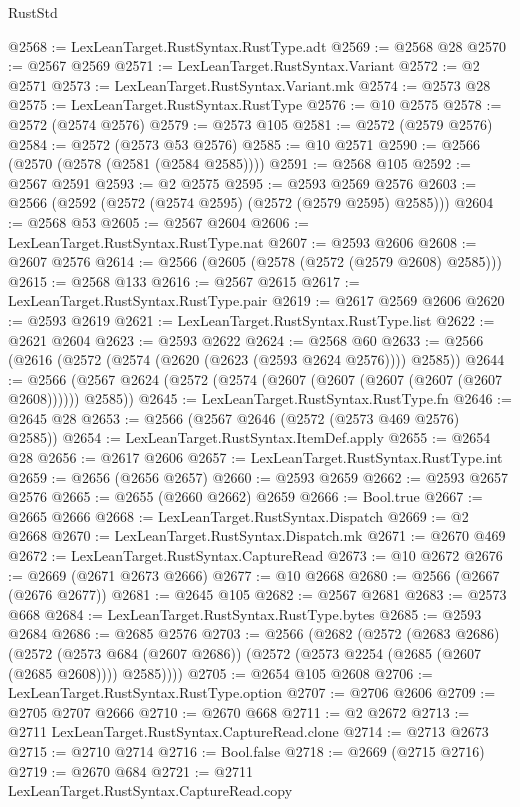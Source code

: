 \begin{lexlean}{RustStd}
\begin{coremodule}
{\begin{coremodule}
{{{{{{{{{{{{{{{{{{{{{{{{{{{{{{{{{{{{{{{{{{{{{{{{{{{{{{{{{{{{{{{{{{{{{{{{{{{{{{@2568 := LexLeanTarget.RustSyntax.RustType.adt
@2569 := @2568 @28
@2570 := @2567 @2569
@2571 := LexLeanTarget.RustSyntax.Variant
@2572 := @2 @2571
@2573 := LexLeanTarget.RustSyntax.Variant.mk
@2574 := @2573 @28
@2575 := LexLeanTarget.RustSyntax.RustType
@2576 := @10 @2575
@2578 := @2572 (@2574 @2576)
@2579 := @2573 @105
@2581 := @2572 (@2579 @2576)
@2584 := @2572 (@2573 @53 @2576)
@2585 := @10 @2571
@2590 := @2566 (@2570 (@2578 (@2581 (@2584 @2585))))
@2591 := @2568 @105
@2592 := @2567 @2591
@2593 := @2 @2575
@2595 := @2593 @2569 @2576
@2603 := @2566 (@2592 (@2572 (@2574 @2595) (@2572 (@2579 @2595) @2585)))
@2604 := @2568 @53
@2605 := @2567 @2604
@2606 := LexLeanTarget.RustSyntax.RustType.nat
@2607 := @2593 @2606
@2608 := @2607 @2576
@2614 := @2566 (@2605 (@2578 (@2572 (@2579 @2608) @2585)))
@2615 := @2568 @133
@2616 := @2567 @2615
@2617 := LexLeanTarget.RustSyntax.RustType.pair
@2619 := @2617 @2569 @2606
@2620 := @2593 @2619
@2621 := LexLeanTarget.RustSyntax.RustType.list
@2622 := @2621 @2604
@2623 := @2593 @2622
@2624 := @2568 @60
@2633 := @2566 (@2616 (@2572 (@2574 (@2620 (@2623 (@2593 @2624 @2576)))) @2585))
@2644 := @2566 (@2567 @2624 (@2572 (@2574 (@2607 (@2607 (@2607 (@2607 (@2607 @2608)))))) @2585))
@2645 := LexLeanTarget.RustSyntax.RustType.fn
@2646 := @2645 @28
@2653 := @2566 (@2567 @2646 (@2572 (@2573 @469 @2576) @2585))
@2654 := LexLeanTarget.RustSyntax.ItemDef.apply
@2655 := @2654 @28
@2656 := @2617 @2606
@2657 := LexLeanTarget.RustSyntax.RustType.int
@2659 := @2656 (@2656 @2657)
@2660 := @2593 @2659
@2662 := @2593 @2657 @2576
@2665 := @2655 (@2660 @2662) @2659
@2666 := Bool.true
@2667 := @2665 @2666
@2668 := LexLeanTarget.RustSyntax.Dispatch
@2669 := @2 @2668
@2670 := LexLeanTarget.RustSyntax.Dispatch.mk
@2671 := @2670 @469
@2672 := LexLeanTarget.RustSyntax.CaptureRead
@2673 := @10 @2672
@2676 := @2669 (@2671 @2673 @2666)
@2677 := @10 @2668
@2680 := @2566 (@2667 (@2676 @2677))
@2681 := @2645 @105
@2682 := @2567 @2681
@2683 := @2573 @668
@2684 := LexLeanTarget.RustSyntax.RustType.bytes
@2685 := @2593 @2684
@2686 := @2685 @2576
@2703 := @2566
    (@2682
      (@2572
        (@2683 @2686)
        (@2572
          (@2573 @684 (@2607 @2686))
          (@2572 (@2573 @2254 (@2685 (@2607 (@2685 @2608)))) @2585))))
@2705 := @2654 @105 @2608
@2706 := LexLeanTarget.RustSyntax.RustType.option
@2707 := @2706 @2606
@2709 := @2705 @2707 @2666
@2710 := @2670 @668
@2711 := @2 @2672
@2713 := @2711 LexLeanTarget.RustSyntax.CaptureRead.clone
@2714 := @2713 @2673
@2715 := @2710 @2714
@2716 := Bool.false
@2718 := @2669 (@2715 @2716)
@2719 := @2670 @684
@2721 := @2711 LexLeanTarget.RustSyntax.CaptureRead.copy
}}}}}}}}}}}}}}}}}}}}}}}}}}}}}}}}}}}}}}}}}}}}}}}}}}}}}}}}}}}}}}}}}}}}}}}}}}}}}}
\end{coremodule}}
\end{coremodule}
\end{lexlean}
